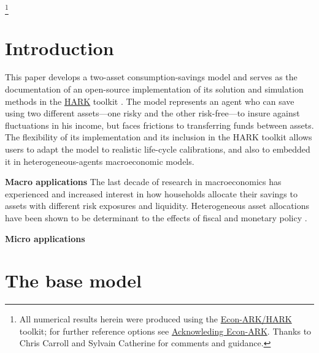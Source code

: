 \documentclass[./RiskyContrib.tex]{subfiles}
\begin{document}
\begin{authorsinfo}
\end{authorsinfo}

\thanks{All numerical results herein were produced using the \href{https://econ-ark/HARK}{Econ-ARK/HARK} toolkit; for further reference options see \href{https://econ-ark.org/acknowledging/}{Acknowleding Econ-ARK}.  Thanks to Chris Carroll and Sylvain Catherine for comments and guidance.}

\titlepagefinish

\newtheorem{defn}{Definition}
\newtheorem{theorem}{Theorem}

\hypertarget{Introduction}{}
\section{Introduction}

This paper develops a two-asset consumption-savings model and serves as
the documentation of an open-source implementation of its
solution and simulation methods in the \href{https://econ-ark.org/toolkit}{HARK}
toolkit \citep{carroll2018HARK}. The model represents an agent who can
save using two different assets---one risky and the other risk-free---to insure
against fluctuations in his income, but faces frictions to transferring funds between
assets. The flexibility of its implementation and its inclusion in the HARK
toolkit allows users to adapt the model to realistic life-cycle calibrations, and
also to embedded it in heterogeneous-agents macroeconomic models.

\textbf{Macro applications}
The last decade of research in macroeconomics has experienced and increased
interest in how households allocate their savings to assets with different
risk exposures and liquidity. Heterogeneous asset allocations have been shown
to be determinant to the effects of fiscal and monetary policy
\citep{Kaplan2014ecta,Luetticke2021aej_macro}.

\textbf{Micro applications}

\hypertarget{The-base-model}{}
\section{The base model}
\end{document}
